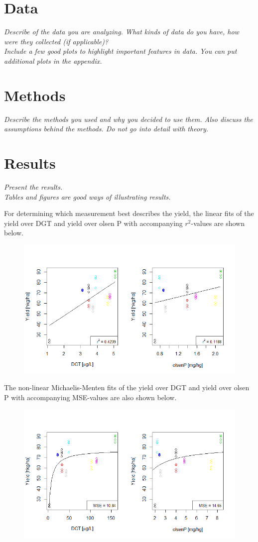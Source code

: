 \documentclass[11pt, fleqn, titlepage]{article}
\begin{document}
\section{Data}
\textit{Describe of the data you are analyzing. What kinds of data do you have, how were they collected (if applicable)? \\ Include a few good plots to highlight important features in data. You can put additional plots in the appendix.}

\section{Methods}
\textit{Describe the methods you used and why you decided to use them. Also discuss the assumptions behind the methods. Do not go into detail with theory.}

\section{Results}
\textit{Present the results. \\ Tables and figures are good ways of illustrating results.}

For determining which measurement best describes the yield, the linear fits of the yield over DGT and yield over olsen P with accompanying $r^2$-values are shown below.

\begin{figure}[H]
	\centering
	\includegraphics[width=0.7\linewidth]{billeder/Linearfit.png}
	\caption{}
	\label{fig:linearfit}
\end{figure}

\noindent The non-linear Michaelis-Menten fits of the yield over DGT and yield over olsen P with accompanying MSE-values are also shown below.

\begin{figure}[H]
	\centering
	\includegraphics[width=0.7\linewidth]{billeder/non-linearfit.png}
	\caption{}
	\label{fig:non-linearfit}
\end{figure}
\end{document}
